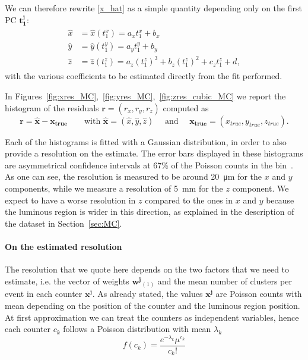 We can therefore rewrite \eqref{x_hat} as a simple quantity depending only on the first PC $\mathbf{t^j_1}$:
\begin{align}
\begin{split}
    \hat{x} &= \hat{x}(t^x_1) = a_x t^x_1 + b_x \\
    \hat{y} &= \hat{y}(t^y_1) = a_y t^y_1 + b_y \\\label{x_hat_true}
    \hat{z} &= \hat{z}(t^z_1) = a_z (t^z_1)^3 + b_z (t^z_1)^2 + c_z  t^z_1 + d,
    \end{split}
\end{align} 
with the various coefficients to be estimated directly from the fit performed. 

In Figures~\ref{fig:xres_MC},~\ref{fig:yres_MC},~\ref{fig:zres_cubic_MC} we report the histogram of the residuals $\mathbf{r}=(r_x, r_y, r_z)$ computed as 
 \begin{equation}
     \mathbf{r}=\hat{\mathbf{x}} - \mathbf{x_{true}} \qquad \text{with } \hat{\mathbf{x}} = (\hat{x}, \hat{y}, \hat{z}) \quad \text{ and } \quad \mathbf{x_{true}}=(x_{true}, y_{true}, z_{true}).
 \end{equation}

 Each of the histograms is fitted with a Gaussian distribution, in order to also provide a resolution on the estimate. The error bars displayed in these histograms are asymmetrical confidence intervals at $67$\% of the Poisson counts in the bin~\cite{c91e9970-216b-3ca1-adc9-c0f78fd16662}.
 As one can see, the resolution is measured to be around \SI{20}{\micro\meter} for the $x$ and $y$ components, while we measure a resolution of \SI{5}{\milli\meter} for the $z$ component. We expect to have a worse resolution in $z$ compared to the ones in $x$ and $y$ because the luminous region is wider in this direction, as explained in the description of the dataset in Section~\ref{sec:MC}.
 
 \paragraph{On the estimated resolution}
 The resolution that we quote here depends on the two factors that we need to estimate, i.e. the vector of weights $\mathbf{w^j}_{(1)}$ and the mean number of clusters per event in each counter $\mathbf{x^{j}}$. As already stated, the values $\mathbf{x^{j}}$ are Poisson counts with mean depending on the position of the counter and the luminous region position. At first approximation we can treat the counters as independent variables, hence each counter $c_k$ follows a Poisson distribution with mean $\lambda_k$
 \begin{equation}
     f(c_k) = \frac{e^{-\lambda_k} \mu^{c_k}}{c_k!}
 \end{equation}

